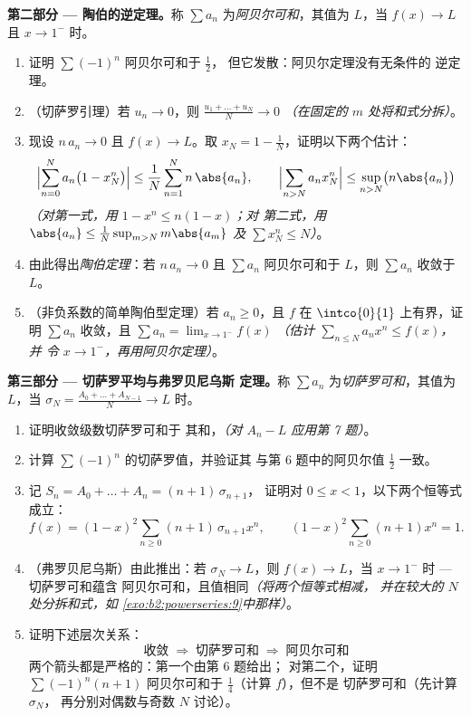 \begin{problem}
\medskip
\noindent\textbf{第二部分 --- 陶伯的逆定理。}称 $\sum
a_n$ 为\emph{阿贝尔可和}，其值为 $L$，当 $f(x) \to L$ 且 $x \to
1^-$ 时。
\begin{enumerate}[resume]
  \item 证明 $\sum (-1)^n$ 阿贝尔可和于 $\frac12$，
        但它发散：阿贝尔定理没有无条件的
        逆定理。
  \item （切萨罗引理）若 $u_n \to 0$，则 $\frac{u_1 + \dots
        + u_N}{N} \to 0$ \emph{（在固定的 $m$ 处将和式分拆）}。
  \item 现设 $n\,a_n \to 0$ 且 $f(x) \to L$。取 $x_N =
        1 - \frac1N$，证明以下两个估计：
        \[
        \Bigl|\sum_{n=0}^{N} a_n\bigl(1 - x_N^n\bigr)\Bigr|
        \leq \frac{1}{N}\sum_{n=1}^{N} n\,\abs{a_n},
        \qquad
        \Bigl|\sum_{n>N} a_n x_N^n\Bigr|
        \leq \sup_{n>N}\bigl(n\abs{a_n}\bigr)
        \]
        \emph{（对第一式，用 $1 - x^n \leq n(1-x)$；对
        第二式，用 $\abs{a_n} \leq \frac{1}{N}\sup_{m>N}
        m\abs{a_m}$ 及 $\sum x_N^n \leq N$）}。
  \item 由此得出\emph{陶伯定理}：若 $n\,a_n \to 0$ 且
        $\sum a_n$ 阿贝尔可和于 $L$，则 $\sum a_n$
        收敛于 $L$。
  \item （非负系数的简单陶伯型定理）若 $a_n
        \geq 0$，且 $f$ 在 $\intco{0}{1}$ 上有界，证明
        $\sum a_n$ 收敛，且 $\sum a_n = \lim_{x\to1^-}
        f(x)$ \emph{（估计 $\sum_{n\leq N}a_nx^n \leq f(x)$，并
        令 $x \to 1^-$，再用阿贝尔定理）}。
\end{enumerate}

\medskip
\noindent\textbf{第三部分 --- 切萨罗平均与弗罗贝尼乌斯
定理。}称 $\sum a_n$ 为\emph{切萨罗可和}，其值为 $L$，当
$\sigma_N = \frac{A_0 + \dots + A_{N-1}}{N} \to L$ 时。
\begin{enumerate}[resume]
  \item 证明收敛级数切萨罗可和于
        其和，\emph{（对 $A_n - L$ 应用第 7 题）}。
  \item 计算 $\sum(-1)^n$ 的切萨罗值，并验证其
        与第 6 题中的阿贝尔值 $\frac12$ 一致。
  \item 记 $S_n = A_0 + \dots + A_n = (n+1)\,\sigma_{n+1}$，
        证明对 $0 \leq x < 1$，以下两个恒等式成立：
        \[
        f(x) = (1-x)^2\sum_{n\geq0}(n+1)\,\sigma_{n+1}x^n,
        \qquad
        (1-x)^2\sum_{n\geq0}(n+1)x^n = 1 .
        \]
  \item （弗罗贝尼乌斯）由此推出：若 $\sigma_N \to L$，则 $f(x) \to
        L$，当 $x \to 1^-$ 时 --- 切萨罗可和蕴含
        阿贝尔可和，且值相同\emph{（将两个恒等式相减，
        并在较大的 $N$ 处分拆和式，如
        \cref{exo:b2:powerseries:9}中那样）}。
  \item 证明下述层次关系：
        \[
        \text{收敛} \;\Longrightarrow\;
        \text{切萨罗可和} \;\Longrightarrow\;
        \text{阿贝尔可和}
        \]
        两个箭头都是严格的：第一个由第 6 题给出；
        对第二个，证明 $\sum(-1)^n(n+1)$
        阿贝尔可和于 $\frac14$（计算 $f$），但不是
        切萨罗可和（先计算 $\sigma_N$，
        再分别对偶数与奇数 $N$ 讨论）。
\end{enumerate}


\end{problem}

